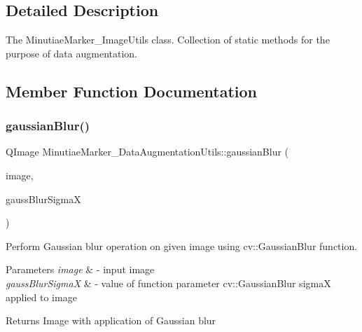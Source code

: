 \subsection{Detailed Description}
The Minutiae\+Marker\+\_\+\+Image\+Utils class. Collection of static methods for the purpose of data augmentation. 

\subsection{Member Function Documentation}
\mbox{\label{class_minutiae_marker___data_augmentation_utils_a2c31bbec754608bf96326e76811eab8b}} 
\subsubsection{\texorpdfstring{gaussian\+Blur()}{gaussianBlur()}}
{\footnotesize\ttfamily Q\+Image Minutiae\+Marker\+\_\+\+Data\+Augmentation\+Utils\+::gaussian\+Blur (\begin{DoxyParamCaption}\item[{Q\+Image}]{image,  }\item[{double}]{gauss\+Blur\+SigmaX }\end{DoxyParamCaption})\hspace{0.3cm}{\ttfamily [static]}}



Perform Gaussian blur operation on given image using cv\+::\+Gaussian\+Blur function. 


\begin{DoxyParams}{Parameters}
{\em image} & -\/ input image \\
\hline
{\em gauss\+Blur\+SigmaX} & -\/ value of function parameter cv\+::\+Gaussian\+Blur sigmaX applied to image \\
\hline
\end{DoxyParams}
\begin{DoxyReturn}{Returns}
Image with application of Gaussian blur 
\end{DoxyReturn}
\mbox{\label{class_minutiae_marker___data_augmentation_utils_afbbaf18bd05e76fd50301d769d1aa1ea}} 
